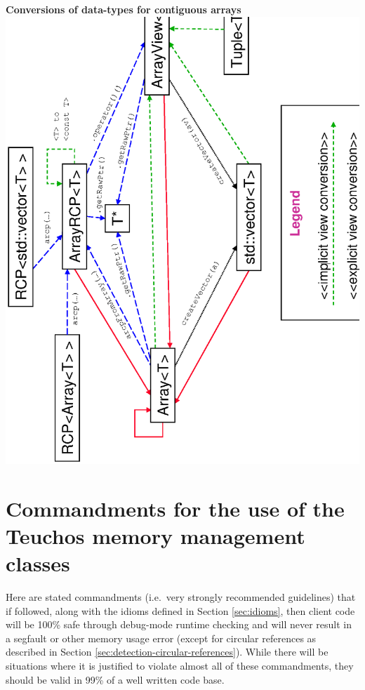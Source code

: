 \documentclass[pdf,ps2pdf,11pt]{SANDreport}
\begin{document}
\begin{center}
{}\textbf{Conversions of data-types for contiguous arrays}
\includegraphics*[angle=270,scale=0.65]{TeuchosArrayConversions}

\pagebreak



\pagebreak



\end{center}


%
{}\section{Commandments for the use of the Teuchos memory management
classes}
\label{apdx:commandments}
%

Here are stated commandments (i.e.\ very strongly recommended
guidelines) that if followed, along with the idioms defined in
Section {}\ref{sec:idioms}, then client code will be 100\% safe
through debug-mode runtime checking and will never result in a
segfault or other memory usage error (except for circular references
as described in Section {}\ref{sec:detection-circular-references}).
While there will be situations where it is justified to violate almost
all of these commandments, they should be valid in 99\% of a well
written code base.
\end{document}
